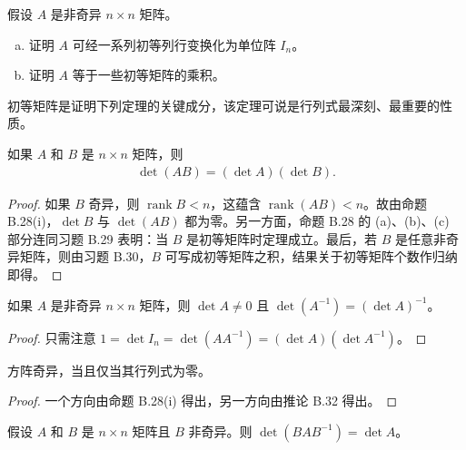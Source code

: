 \documentclass[../../main.tex]{subfiles}
\begin{document}
\begin{exercise}\label{exercise:appB-B-30}
假设 $A$ 是非奇异 $n\times n$ 矩阵。
\begin{enumerate}[(a)]
\item 证明 $A$ 可经一系列初等列行变换化为单位阵 $I_n$。
\item 证明 $A$ 等于一些初等矩阵的乘积。
\end{enumerate}
\end{exercise}

初等矩阵是证明下列定理的关键成分，该定理可说是行列式最深刻、最重要的性质。

\begin{theorem}\label{theorem:appB-det-product}
如果 $A$ 和 $B$ 是 $n\times n$ 矩阵，则
\begin{align*}
\det(AB)=(\det A)(\det B).
\end{align*}
\end{theorem}

\begin{proof}
如果 $B$ 奇异，则 $\operatorname{rank}B<n$，这蕴含 $\operatorname{rank}(AB)<n$。故由命题 B.28(i)，$\det B$ 与 $\det(AB)$ 都为零。另一方面，命题 B.28 的 (a)、(b)、(c) 部分连同习题 B.29 表明：当 $B$ 是初等矩阵时定理成立。最后，若 $B$ 是任意非奇异矩阵，则由习题 B.30，$B$ 可写成初等矩阵之积，结果关于初等矩阵个数作归纳即得。
\end{proof}

\begin{corollary}\label{corollary:appB-det-inverse}
如果 $A$ 是非奇异 $n\times n$ 矩阵，则 $\det A\neq0$ 且 $\det(A^{-1})=(\det A)^{-1}$。
\end{corollary}

\begin{proof}
只需注意 $1=\det I_n=\det(AA^{-1})=(\det A)(\det A^{-1})$。
\end{proof}

\begin{corollary}\label{corollary:appB-det-zero}
方阵奇异，当且仅当其行列式为零。
\end{corollary}

\begin{proof}
一个方向由命题 B.28(i) 得出，另一方向由推论 B.32 得出。
\end{proof}

\begin{corollary}\label{corollary:appB-det-conjugacy}
假设 $A$ 和 $B$ 是 $n\times n$ 矩阵且 $B$ 非奇异。则 $\det(BAB^{-1})=\det A$。
\end{corollary}
\end{document}
